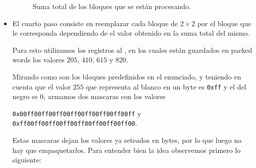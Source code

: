 \begin{itemize}
\begin{figure}[H]

    \caption{Suma total de los bloques que se están procesando.}
    \label{PHADDW}
  \end{figure}

  \item El cuarto paso consiste en reemplazar cada bloque de $2 \times 2$ por el bloque que le corresponda dependiendo de el valor obtenido en la suma total del mismo.

  Para esto utilizamos los registros  al , en los cuales están guardados en packed words los valores $205$, $410$, $615$ y $820$.

  Mirando como son los bloques predefinidos en el enunciado, y teniendo en cuenta que el valor $255$ que representa al blanco en un byte es \texttt{0xff} y el del negro es 0, armamos dos mascaras con los valores

  \texttt{0x00ff00ff00ff00ff00ff00ff00ff00ff} y \texttt{0xff00ff00ff00ff00ff00ff00ff00ff00}.

  Estas mascaras dejan los valores ya seteados en bytes, por lo que luego no hay que empaquetarlos.
  Para entender bien la idea observemos primero lo siguiente:


\end{itemize}
